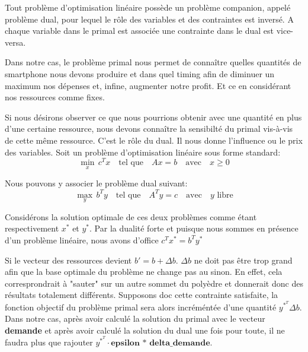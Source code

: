 Tout problème d'optimisation linéaire possède un problème companion, appelé problème dual, pour lequel le rôle des variables et des contraintes est inversé. A chaque variable dans le primal est associée une contrainte dans le dual est vice-versa.

Dans notre cas, le problème primal nous permet de connaître quelles quantités de smartphone nous devons produire et dans quel timing afin de diminuer un maximum nos dépenses et, infine, augmenter notre profit. Et ce en considérant nos ressources comme fixes.

Si nous désirons observer ce que nous pourrions obtenir avec une quantité en plus d'une certaine ressource, nous devons connaître la sensibilté du primal vis-à-vis de cette même ressource. C'est le rôle du dual. Il nous donne l'influence ou le prix des variables. Soit un problème d'optimisation linéaire sous forme standard:
\[
    \min_{x}\,c^{T}x
    \quad\text{tel que}\quad
    Ax = b
    \quad\text{avec}\quad
    x \geq 0
\]

Nous pouvons y associer le problème dual suivant:
\[
    \max_{y}\,b^{T}y
    \quad\text{tel que}\quad
    A^{T}y = c
    \quad\text{avec}\quad
    y \text{ libre}
\]

Considérons la solution optimale de ces deux problèmes comme étant respectivement $x^{*}$ et $y^{*}$. Par la dualité forte et puisque nous sommes en présence d'un problème linéaire, nous avons d'office $ c^{T}x^{*} = b^{T}y^{*}$

Si le vecteur des ressources devient $ b' = b + \Delta b $. $\Delta b$ ne doit pas être trop grand afin que la base optimale du problème ne change pas au sinon. En effet, cela corresprondrait à "sauter" sur un autre sommet du polyèdre et donnerait donc des résultats totalement différents. Supposons doc cette contrainte satisfaite, la fonction objectif du problème primal sera alors incréméntée d'une quantité $y^{*^{T}}\Delta b$. Dans notre cas, après avoir calculé la solution du primal avec le vecteur \textbf{demande} et après avoir calculé la solution du dual une fois pour toute, il ne faudra plus que rajouter $y^{*^{T}} \cdot \textbf{epsilon * delta\_demande}$.
